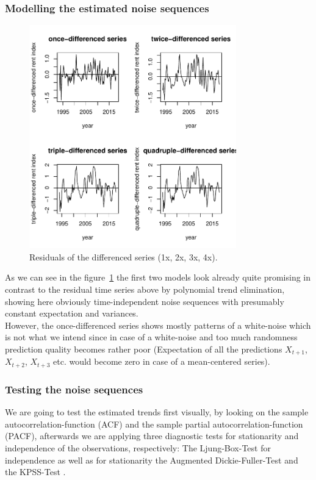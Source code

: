 \documentclass[11pt,a4paper]{article}
\begin{document}
\subsubsection{Modelling the estimated noise sequences}

\begin{figure}[!htb]
\centering
\includegraphics[angle=0,
width=0.8\textwidth]{resid_diff_all}
\caption{Residuals of the differenced series (1x, 2x, 3x, 4x).
\label{fig:resid_diff_all}}
\end{figure}
As we can see in the figure~\ref{fig:resid_diff_all} the first two models look already quite promising in contrast to the residual time series above by polynomial trend elimination, showing here obviously time-independent noise sequences with presumably constant expectation and variances. \\
However, the once-differenced series shows mostly patterns of a white-noise which is not what we intend since in case of a white-noise and too much randomness prediction quality becomes rather poor (Expectation of all the predictions $X_{t+1}$, $X_{t+2}$, $X_{t+3}$ etc. would become zero in case of a mean-centered series). 

\subsubsection{Testing the noise sequences}
We are going to test the estimated trends first visually, by looking on the sample autocorrelation-function (ACF) and the sample partial autocorrelation-function (PACF), afterwards we are applying three diagnostic tests for stationarity and independence of the observations, respectively: The Ljung-Box-Test \citep{LjungBox78} for independence as well as for stationarity the Augmented Dickie-Fuller-Test \citep{adf} and the KPSS-Test \citep{kpss92}. \\
\end{document}
